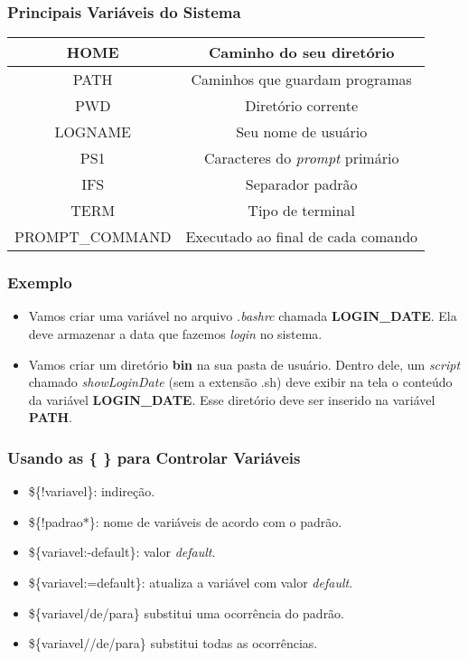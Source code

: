\documentclass{beamer}
\begin{document}
   \begin{frame}
      \frametitle{Principais Variáveis do Sistema}
      \begin{table}
         \begin{tabular}{c|c}
         HOME  & Caminho do seu diretório\\
         \hline
         PATH  & Caminhos que guardam programas\\
         \hline 
         PWD  & Diretório corrente\\
         \hline
         LOGNAME & Seu nome de usuário \\
         \hline 
         PS1  & Caracteres do \textit{prompt} primário\\
         \hline 
         IFS  & Separador padrão\\
         \hline 
         TERM  & Tipo de terminal \\
         \hline 
	      PROMPT\_COMMAND & Executado ao final de cada comando \\
         \end{tabular}
      \end{table}
   \end{frame}

   \begin{frame}
      \frametitle{Exemplo}
      \begin{itemize}
         \item Vamos criar uma variável no arquivo \textit{.bashrc} chamada \textbf{LOGIN\_DATE}. Ela deve armazenar a data que fazemos \textit{login} no sistema.
	      \item Vamos criar um diretório \textbf{bin} na sua pasta de usuário. Dentro dele, um \textit{script} chamado \textit{showLoginDate} (sem a extensão .sh) deve exibir na tela o conteúdo da variável \textbf{LOGIN\_DATE}. Esse diretório deve ser inserido na variável \textbf{PATH}.
      \end{itemize}
   \end{frame}

   \begin{frame}
      \frametitle{Usando as \{ \} para Controlar Variáveis}
      \begin{itemize}
         \item \$\{!variavel\}: indireção.
	      \item \$\{!padrao$*$\}: nome de variáveis de acordo com o padrão.
	      \item \$\{variavel:-default\}: valor \textit{default}.
	      \item \$\{variavel:=default\}: atualiza a variável com valor \textit{default}.
         \item \$\{variavel\slash de\slash para\} substitui uma ocorrência do padrão.
         \item \$\{variavel\slash\slash de\slash para\} substitui todas as ocorrências.
      \end{itemize}
   \end{frame}
 
\end{document}
